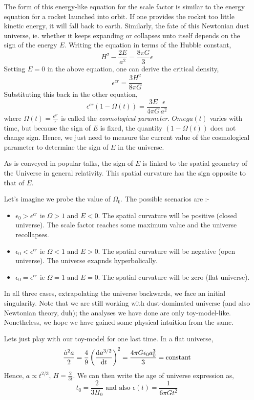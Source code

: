 \documentclass[a4paper,11pt]{article}
\begin{document}
The form of this energy-like equation for the scale factor is similar to the energy equation for a rocket launched into orbit. If one provides the rocket too little kinetic energy, it will fall back to earth. Similarly, the fate of this Newtonian dust universe, ie. whether it keeps expanding or collapses unto itself depends on the sign of the energy $E$. Writing the equation in terms of the Hubble constant,
$$H^2 - \frac{2E}{a^2} = \frac{8 \pi G}{3}\epsilon$$
Setting $E=0$ in the above equation, one can derive the critical density,
$$\epsilon^{cr} = \frac{3H^2}{8\pi G}$$ Substituting this back in the other equation,
$$\epsilon^{cr}(1 - \Omega(t))= \frac{3E}{4 \pi G} \frac{\epsilon}{a^2}$$
where $\Omega(t) = \frac{\epsilon^{cr}}{\epsilon}$ is called the \textit{cosmological parameter}. $Omega(t)$ varies with time, but because the sign of $E$ is fixed, the quantity $(1-\Omega(t))$ does not change sign. Hence, we just need to measure the current value of the cosmological parameter to determine the sign of $E$ in the universe.

As is conveyed in popular talks, the sign of $E$ is linked to the spatial geometry of the Universe in general relativity. This spatial curvature has the sign opposite to that of $E$.

 Let's imagine we probe the value of $\Omega_0$. The possible scenarios are :-
\begin{itemize}
	\item $\epsilon_0 > \epsilon^{cr}$ ie $\Omega > 1$ and $E < 0$. The spatial curvature will be positive (closed universe). The scale factor reaches some maximum value and the universe recollapses.
	\item $\epsilon_0 < \epsilon^{cr}$ ie $\Omega < 1$ and $E > 0$. The spatial curvature will be negative (open universe). The universe exapnds hyperbolically.
	\item $\epsilon_0 = \epsilon^{cr}$ ie $\Omega = 1$ and $E = 0$. The spatial curvature will be zero (flat universe).
\end{itemize}

In all three cases, extrapolating the universe backwards, we face an initial singularity. Note that we are still working with dust-dominated universe (and also Newtonian theory, duh); the analyses we have done are only toy-model-like. Nonetheless, we hope we have gained some physical intuition from the same.

Lets just play with our toy-model for one last time. In a flat universe,
$$\frac{\dot{a}^2a}{2} = \frac{4}{9} \left(\derivative{a^{3/2}}{t} \right)^2 = \frac{4 \pi G \epsilon_0 a_0^3}{3} = \text{constant} $$
Hence, $a \propto t^{2/3}$, $H = \frac{2}{3t}$. We can then write the age of universe expression as,
$$t_0 = \frac{2}{3H_0} \text{ and also } \epsilon(t) = \frac{1}{6 \pi G t^2}$$
\end{document}
